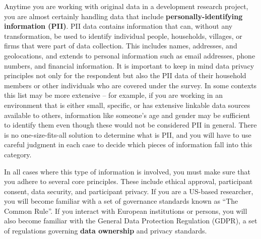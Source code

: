 Anytime you are working with original data in a development research project,
you are almost certainly handling data that include \textbf{personally-identifying
	information (PII)}.
PII data contains information that can, without any transformation, be used to identify
individual people, households, villages, or firms that were part of data collection.
This includes names, addresses, and geolocations, and extends to personal information
such as email addresses, phone numbers, and financial information.
It is important to keep in mind data privacy principles not only for the  respondent 
but also the PII data of their household members or other individuals who are covered under the survey.
In some contexts this list may be more extensive --
for example, if you are working in an environment that is either small, specific,
or has extensive linkable data sources available to others,
information like someone's age and gender may be sufficient to identify them
even though these would not be considered PII in general.
There is no one-size-fits-all solution to determine what is PII, and you will have to use careful judgment in each case
to decide which pieces of information fall into this category.

In all cases where this type of information is involved,
you must make sure that you adhere to several core principles.
These include ethical approval, participant consent, data security, and participant privacy.
If you are a US-based researcher, you will become familiar
with a set of governance standards known as ``The Common Rule''.
If you interact with European institutions or persons,
you will also become familiar with the General Data Protection Regulation (GDPR),
a set of regulations governing \textbf{data ownership} and privacy standards.

